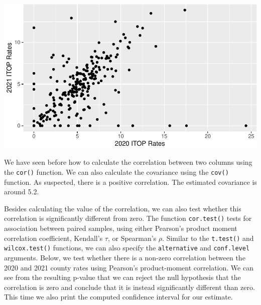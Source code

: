 \documentclass[
  letterpaper,
]{krantz}
\makeatletter
\newenvironment{Shaded}{\begin{snugshade}}{\end{snugshade}}
\newcommand{\CommentTok}[1]{\textcolor[rgb]{0.37,0.37,0.37}{#1}}
\newcommand{\FunctionTok}[1]{\textcolor[rgb]{0.28,0.35,0.67}{#1}}
\newcommand{\NormalTok}[1]{\textcolor[rgb]{0.00,0.23,0.31}{#1}}
\newcommand{\SpecialCharTok}[1]{\textcolor[rgb]{0.37,0.37,0.37}{#1}}
\newenvironment{kframe}{%
\medskip{}
\setlength{\fboxsep}{.8em}
 \def\at@end@of@kframe{}%
 \ifinner\ifhmode%
  \def\at@end@of@kframe{\end{minipage}}%
  \begin{minipage}{\columnwidth}%
 \fi\fi%
 \def\FrameCommand##1{\hskip\@totalleftmargin \hskip-\fboxsep
 \colorbox{shadecolor}{##1}\hskip-\fboxsep
     \hskip-\linewidth \hskip-\@totalleftmargin \hskip\columnwidth}%
 \MakeFramed {\advance\hsize-\width
   \@totalleftmargin\z@ \linewidth\hsize
   \@setminipage}}%
 {\par\unskip\endMakeFramed%
 \at@end@of@kframe}
\renewenvironment{Shaded}{\begin{kframe}}{\end{kframe}}
\makeatother
\begin{document}
\begin{center}
\includegraphics[width=1\textwidth,height=\textheight]{book/hypothesis_tests_files/figure-pdf/unnamed-chunk-13-1.pdf}
\end{center}

We have seen before how to calculate the correlation between two columns
using the \texttt{cor()} function. We can also calculate the covariance
using the \texttt{cov()} function. As suspected, there is a positive
correlation. The estimated covariance is around 5.2.

\begin{Shaded}
\end{Shaded}

Besides calculating the value of the correlation, we can also test
whether this correlation is significantly different from zero. The
function \texttt{cor.test()} tests for association between paired
samples, using either Pearson's product moment correlation coefficient,
Kendall's \(\tau\), or Spearman's \(\rho\). Similar to the
\texttt{t.test()} and \texttt{wilcox.test()} functions, we can also
specify the \texttt{alternative} and \texttt{conf.level} arguments.
Below, we test whether there is a non-zero correlation between the 2020
and 2021 county rates using Pearson's product-moment correlation. We can
see from the resulting p-value that we can reject the null hypothesis
that the correlation is zero and conclude that it is instead
significantly different than zero. This time we also print the computed
confidence interval for our estimate.
\end{document}
